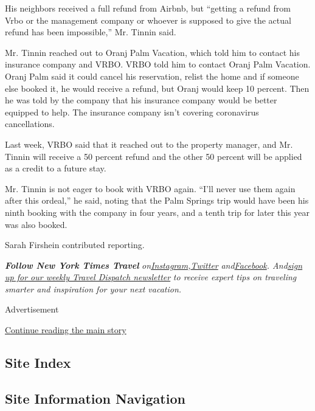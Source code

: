 His neighbors received a full refund from Airbnb, but ``getting a refund
from Vrbo or the management company or whoever is supposed to give the
actual refund has been impossible,'' Mr. Tinnin said.

Mr. Tinnin reached out to Oranj Palm Vacation, which told him to contact
his insurance company and VRBO. VRBO told him to contact Oranj Palm
Vacation. Oranj Palm said it could cancel his reservation, relist the
home and if someone else booked it, he would receive a refund, but Oranj
would keep 10 percent. Then he was told by the company that his
insurance company would be better equipped to help. The insurance
company isn't covering coronavirus cancellations.

Last week, VRBO said that it reached out to the property manager, and
Mr. Tinnin will receive a 50 percent refund and the other 50 percent
will be applied as a credit to a future stay.

Mr. Tinnin is not eager to book with VRBO again. ``I'll never use them
again after this ordeal,'' he said, noting that the Palm Springs trip
would have been his ninth booking with the company in four years, and a
tenth trip for later this year was also booked.

Sarah Firshein contributed reporting.

\emph{\textbf{Follow New York Times Travel}}
\emph{on}\href{https://www.instagram.com/nytimestravel/}{\emph{Instagram}}\emph{,}\href{https://twitter.com/nytimestravel}{\emph{Twitter}}
\emph{and}\href{https://www.facebookcorewwwi.onion/nytimestravel/}{\emph{Facebook}}\emph{.
And}\href{https://www.nytimes3xbfgragh.onion/newsletters/traveldispatch}{\emph{sign
up for our weekly Travel Dispatch newsletter}} \emph{to receive expert
tips on traveling smarter and inspiration for your next vacation.}

Advertisement

\protect\hyperlink{after-bottom}{Continue reading the main story}

\hypertarget{site-index}{%
\subsection{Site Index}\label{site-index}}

\hypertarget{site-information-navigation}{%
\subsection{Site Information
Navigation}\label{site-information-navigation}}

